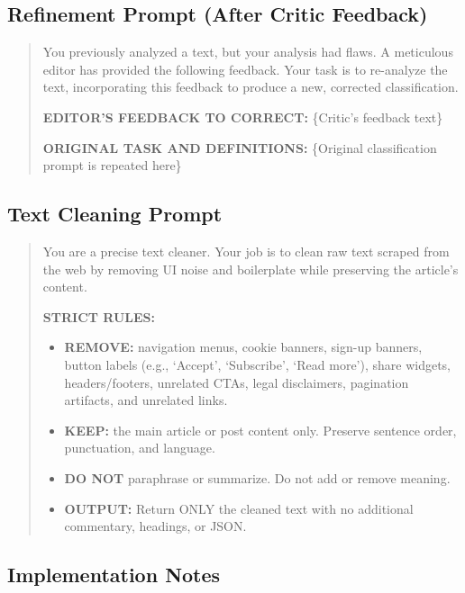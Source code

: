 \subsection{Refinement Prompt (After Critic Feedback)}

\begin{small}
\begin{quote}
You previously analyzed a text, but your analysis had flaws. A meticulous editor has provided the following feedback. Your task is to re-analyze the text, incorporating this feedback to produce a new, corrected classification.

\textbf{EDITOR'S FEEDBACK TO CORRECT:} \{Critic's feedback text\}

\textbf{ORIGINAL TASK AND DEFINITIONS:} \{Original classification prompt is repeated here\}
\end{quote}
\end{small}

\subsection{Text Cleaning Prompt}

\begin{small}
\begin{quote}
You are a precise text cleaner. Your job is to clean raw text scraped from the web by removing UI noise and boilerplate while preserving the article's content.

\textbf{STRICT RULES:}
\begin{itemize}
\item \textbf{REMOVE:} navigation menus, cookie banners, sign-up banners, button labels (e.g., `Accept', `Subscribe', `Read more'), share widgets, headers/footers, unrelated CTAs, legal disclaimers, pagination artifacts, and unrelated links.
\item \textbf{KEEP:} the main article or post content only. Preserve sentence order, punctuation, and language.
\item \textbf{DO NOT} paraphrase or summarize. Do not add or remove meaning.
\item \textbf{OUTPUT:} Return ONLY the cleaned text with no additional commentary, headings, or JSON.
\end{itemize}
\end{quote}
\end{small}

\subsection{Implementation Notes}

